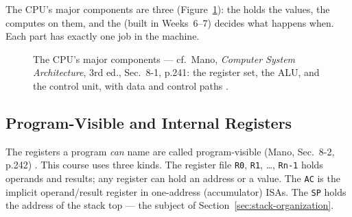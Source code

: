 \documentclass[11pt]{article}
\begin{document}
The CPU's major components are three (Figure~\ref{fig:cpu-components}): the  holds the values, the  computes on them, and the  (built in Weeks~6--7) decides what happens when. Each part has exactly one job in the machine.

\begin{figure}[h]
  \centering
  \caption{The CPU's major components --- cf.\ Mano, \textit{Computer System Architecture}, 3rd ed., Sec.~8-1, p.241: the register set, the ALU, and the control unit, with data and control paths \cite{Mano1993_computer_system_architecture}.}
  \label{fig:cpu-components}
\end{figure}

\subsection{Program-Visible and Internal Registers}

The registers a program \emph{can} name are called program-visible (Mano, Sec.~8-2, p.242) \cite{Mano1993_computer_system_architecture}. This course uses three kinds. The  register file \texttt{R0}, \texttt{R1}, \dots, \texttt{Rn-1} holds operands and results; any register can hold an address or a value. The  \texttt{AC} is the implicit operand/result register in one-address (accumulator) ISAs. The  \texttt{SP} holds the address of the stack top --- the subject of Section~\ref{sec:stack-organization}.
\end{document}
